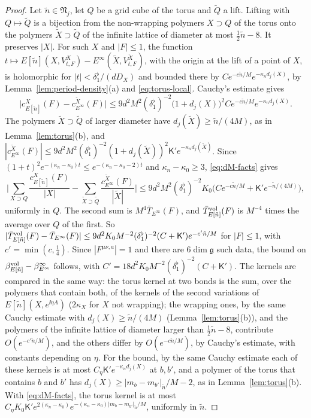\begin{proof}
Let $\tilde n\in\mathfrak N_j$, let $Q$ be a grid cube of the torus and $\tilde Q$ a lift. Lifting with $Q\mapsto\tilde Q$ is a bijection from the non-wrapping polymers $X\supset Q$ of the torus onto the polymers $\tilde X\supset\tilde Q$ of the infinite lattice of diameter at most $\frac12\tilde n-8$. It preserves $|X|$. For such $X$ and $|F|\le1$, the function $t\mapsto E[\tilde n](X,V^X_{t,F})-E^\infty(\tilde X,V^{\tilde X}_{t,F})$, with the origin at the lift of a point of $X$, is holomorphic for $|t|<\delta_1^\flat/(dD_X)$ and bounded there by $Ce^{-c\tilde n/M}e^{-\kappa_nd_j(X)}$, by Lemma~\ref{lem:period-density}(a) and \eqref{eq:torus-local}. Cauchy's estimate gives
\[
\big|c^X_{E[\tilde n]}(F)-c^{\tilde X}_{E^\infty}(F)\big|\le9d^2M^2(\delta_1^\flat)^{-2}\big(1+d_j(X)\big)^2Ce^{-c\tilde n/M}e^{-\kappa_nd_j(X)} .
\]
The polymers $\tilde X\supset\tilde Q$ of larger diameter have $d_j(\tilde X)\ge\tilde n/(4M)$, as in Lemma~\ref{lem:torus}(b), and $|c^{\tilde X}_{E^\infty}(F)|\le9d^2M^2(\delta_1^\flat)^{-2}(1+d_j(\tilde X))^2\mathsf K'e^{-\kappa_nd_j(\tilde X)}$. Since $(1+t)^2e^{-(\kappa_n-\kappa_0)t}\le e^{-(\kappa_n-\kappa_0-2)t}$ and $\kappa_n-\kappa_0\ge3$, \eqref{eq:dM-facts} gives
\[
\Big|\sum_{X\supset Q}\frac{c^X_{E[\tilde n]}(F)}{|X|}-\sum_{\tilde X\supset\tilde Q}\frac{c^{\tilde X}_{E^\infty}(F)}{|\tilde X|}\Big|\le9d^2M^2(\delta_1^\flat)^{-2}K_0\big(Ce^{-c\tilde n/M}+\mathsf K'e^{-\tilde n/(4M)}\big),
\]
uniformly in $Q$. The second sum is $M^4\bar T_{E^\infty}(F)$, and $\bar T^{\rm vol}_{E[\tilde n]}(F)$ is $M^{-4}$ times the average over $Q$ of the first. So $|\bar T^{\rm vol}_{E[\tilde n]}(F)-\bar T_{E^\infty}(F)|\le9d^2K_0M^{-2}(\delta_1^\flat)^{-2}(C+\mathsf K')e^{-c'\tilde n/M}$ for $|F|\le1$, with $c'=\min(c,\frac14)$. Since $|F^{\mu\nu,a}|=1$ and there are $6\dim\mathfrak g$ such data, the bound on $\beta^{\rm vol}_{E[\tilde n]}-\beta^\infty_{E^\infty}$ follows, with $C'=18d^2K_0M^{-2}(\delta_1^\flat)^{-2}(C+\mathsf K')$. The kernels are compared in the same way: the torus kernel at two bonds is the sum, over the polymers that contain both, of the kernels of the second variations of $E[\tilde n](X,e^{\ii\eta A})$ ($2\kappa_X$ for $X$ not wrapping); the wrapping ones, by the same Cauchy estimate with $d_j(X)\ge\tilde n/(4M)$ (Lemma~\ref{lem:torus}(b)), and the polymers of the infinite lattice of diameter larger than $\frac12\tilde n-8$, contribute $O(e^{-c'\tilde n/M})$, and the others differ by $O(e^{-c\tilde n/M})$, by Cauchy's estimate, with constants depending on $\eta$. For the bound, by the same Cauchy estimate each of these kernels is at most $C_\eta\mathsf K'e^{-\kappa_nd_j(X)}$ at $b,b'$, and a polymer of the torus that contains $b$ and $b'$ has $d_j(X)\ge|m_b-m_{b'}|_{\tilde n}/M-2$, as in Lemma~\ref{lem:torus}(b). With \eqref{eq:dM-facts}, the torus kernel is at most $C_\eta K_0\mathsf K'e^{2(\kappa_n-\kappa_0)}e^{-(\kappa_n-\kappa_0)|m_b-m_{b'}|_{\tilde n}/M}$, uniformly in $\tilde n$.
\end{proof}

